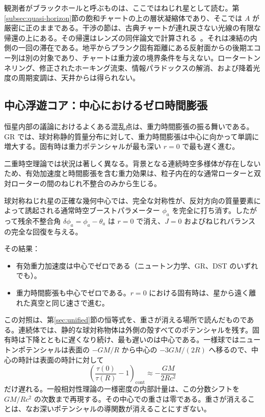 \documentclass[a4paper]{article}
\begin{document}
観測者がブラックホールと呼ぶものは、ここではねじれ星として読む。第\ref{subsec:quasi-horizon}節の飽和チャートの上の層状凝縮体であり、そこでは \(A\) が厳密に正のままである。干渉の節は、古典チャートが連れ戻さない光線の有限な帰還の上にある。その帰還はレンズの同伴論文で計算される~\cite{dst-lensing}。それは凍結の内側の一回の滞在である。地平からプランク固有距離にある反射面からの後期エコー列は別の対象であり、チャートは重力波の境界条件を与えない。ロータートンネリング、修正されたホーキング流束、情報パラドックスの解消、および降着光度の周期変調は、天井からは得られない。

\subsection{中心浮遊コア：中心におけるゼロ時間膨張}
\label{subsec:floating-core}

恒星内部の議論におけるよくある混乱点は、重力時間膨張の振る舞いである。GR では、球対称静的質量分布に対して、重力時間膨張は中心に向かって単調に増大する。固有時は重力ポテンシャルが最も深い \(r=0\) で最も遅く進む。

二重時空理論では状況は著しく異なる。背景となる連続時空多様体が存在しないため、有効加速度と時間膨張を含む重力効果は、粒子内在的な通常ローターと双対ローターの間のねじれ不整合のみから生じる。

球対称ねじれ星の正確な幾何中心では、完全な対称性が、反対方向の質量要素によって誘起される通常時空ブーストパラメーター \(\phi_a\) を完全に打ち消す。したがって残余不整合角 \(\delta\phi_a = \phi_a - \theta_a\) は \(r=0\) で消え、\(J=0\) およびねじれバランスの完全な回復を与える。

その結果：

\begin{itemize}
  \item 有効重力加速度は中心でゼロである（ニュートン力学、GR、DST のいずれでも）。
  \item 重力時間膨張も中心でゼロである。\(r=0\) における固有時は、星から遠く離れた真空と同じ速さで進む。
\end{itemize}

この対照は、第\ref{sec:unified}節の恒等式を、重さが消える場所で読んだものである。連続体では、静的な球対称物体は外側の殻すべてのポテンシャルを残す。固有時は下降とともに遅くなり続け、最も遅いのは中心である。一様球ではニュートンポテンシャルは表面の \(-GM/R\) から中心の \(-3GM/(2R)\) へ移るので、中心の時計は表面の時計に対して
\begin{equation}
\label{eq:continuum-centre}
\left(\frac{\tau(0)}{\tau(R)}-1\right)_{\mathrm{cont}}
\approx -\frac{GM}{2Rc^{2}}
\end{equation}
だけ遅れる。一般相対性理論の一様密度の内部計量は、この分数シフトを \(GM/Rc^{2}\) の次数まで再現する。その中心での重さは零である。重さが消えることは、なお深いポテンシャルの導関数が消えることにすぎない。
\end{document}
